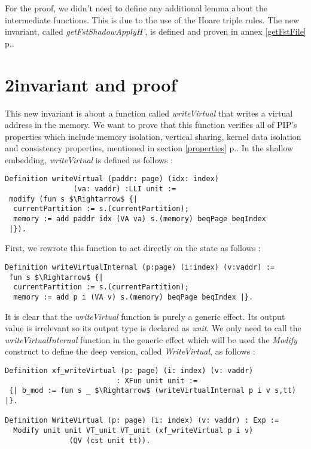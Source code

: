 For the proof, we didn't need to define any additional lemma about the intermediate functions. This is due to the use of the Hoare triple rules. The new invariant, called \textit{getFstShadowApplyH'}, is defined and proven in annex \ref{getFstFile} p.\pageref{getFstFile}.

\section{2\nd invariant and proof} \label{writeInvSec}
This new invariant is about a function called \textit{writeVirtual} that writes a virtual address in the memory. We want to prove that this function verifies all of PIP's properties which include memory isolation, vertical sharing, kernel data isolation and consistency properties, mentioned in section \ref{properties} p.\pageref{properties}. In the shallow embedding, \textit{writeVirtual} is defined as follows : 
\begin{lstlisting}[caption = {writeVirtual function in the shallow embedding}, xleftmargin=-.05\textwidth,
xrightmargin=-.05\textwidth,mathescape=true, label={writeS}]
Definition writeVirtual (paddr: page) (idx: index) 
		        (va: vaddr) :LLI unit :=
 modify (fun s $\Rightarrow$ {| 
  currentPartition := s.(currentPartition);
  memory := add paddr idx (VA va) s.(memory) beqPage beqIndex 
 |}).
\end{lstlisting} \vspace{4pt}
First, we rewrote this function to act directly on the state as follows :
\begin{lstlisting}[caption = {Rewritten shallow writeVirtual function}, xleftmargin=-.06\textwidth,
xrightmargin=-.06\textwidth,mathescape=true]
Definition writeVirtualInternal (p:page) (i:index) (v:vaddr) :=
 fun s $\Rightarrow$ {| 
  currentPartition := s.(currentPartition);
  memory := add p i (VA v) s.(memory) beqPage beqIndex |}.  
\end{lstlisting} \vspace{4pt}
It is clear that the \textit{writeVirtual} function is purely a generic effect. Its output value is irrelevant so its output type is declared as \textit{unit}. We only need to call the \textit{writeVirtualInternal} function in the generic effect which will be used the \textit{Modify} construct to define the deep version, called \textit{WriteVirtual}, as follows : 
\begin{lstlisting}[caption = {WriteVirtual definition}, xleftmargin=-.07\textwidth,
xrightmargin=-.07\textwidth,mathescape=true, label={writeD}]
Definition xf_writeVirtual (p: page) (i: index) (v: vaddr) 
	                      : XFun unit unit := 
 {| b_mod := fun s _ $\Rightarrow$ (writeVirtualInternal p i v s,tt) |}.

Definition WriteVirtual (p: page) (i: index) (v: vaddr) : Exp :=
  Modify unit unit VT_unit VT_unit (xf_writeVirtual p i v) 
  	           (QV (cst unit tt)).    
\end{lstlisting} \vspace{4pt}

